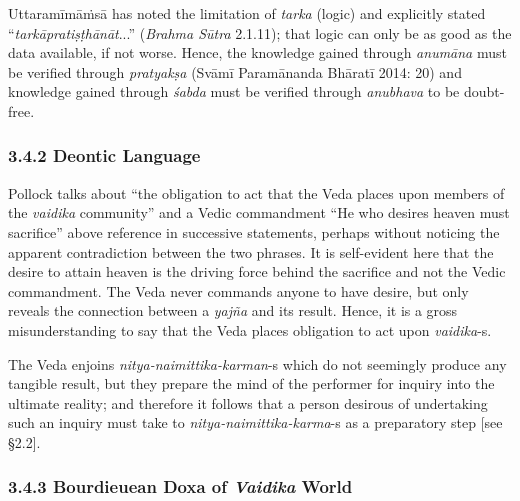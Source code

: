 Uttaramīmāṁsā has noted the limitation of \textit{tarka} (logic) and explicitly stated “\textit{tarkāpratiṣṭhānāt}...” (\textit{Brahma Sūtra} 2.1.11); that logic can only be as good as the data available, if not worse. Hence, the knowledge gained through \textit{anumāna} must be verified through \textit{pratyakṣa} (Svāmī Paramānanda Bhāratī 2014: 20) and knowledge gained through \textit{śabda} must be verified through \textit{anubhava} to be doubt-free.


\subsubsection*{3.4.2 Deontic Language}

Pollock talks about “the obligation to act that the Veda places upon members of the \textit{vaidika} community” and a Vedic commandment “He who desires heaven must sacrifice” above reference in successive statements, perhaps without noticing the apparent contradiction between the two phrases. It is self-evident here that the desire to attain heaven is the driving force behind the sacrifice and not the Vedic commandment. The Veda never commands anyone to have desire, but only reveals the connection between a \textit{yajña} and its result. Hence, it is a gross misunderstanding to say that the Veda places obligation to act upon \textit{vaidika}-s.

The Veda enjoins \textit{nitya-naimittika-karman}-s which do not seemingly produce any tangible result, but they prepare the mind of the performer for inquiry into the ultimate reality; and therefore it follows that a person desirous of undertaking such an inquiry must take to \textit{nitya-naimittika-karma}-s as a preparatory step [see §2.2].


\subsubsection*{3.4.3 Bourdieuean Doxa of \textit{Vaidika} World}


